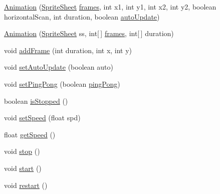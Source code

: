 \begin{DoxyCompactItemize}
\item 
\mbox{\hyperlink{classorg_1_1newdawn_1_1slick_1_1_animation_a417c8882467d579dcccd6befb0b7ae36}{Animation}} (\mbox{\hyperlink{classorg_1_1newdawn_1_1slick_1_1_sprite_sheet}{Sprite\+Sheet}} \mbox{\hyperlink{classorg_1_1newdawn_1_1slick_1_1_animation_a39f0c6a16e479985b22f7dd3bb781bf7}{frames}}, int x1, int y1, int x2, int y2, boolean horizontal\+Scan, int duration, boolean \mbox{\hyperlink{classorg_1_1newdawn_1_1slick_1_1_animation_a343dbff14a050cf8753e9a67746deede}{auto\+Update}})
\item 
\mbox{\hyperlink{classorg_1_1newdawn_1_1slick_1_1_animation_a1c523b4565c8f280afb975c754b817cf}{Animation}} (\mbox{\hyperlink{classorg_1_1newdawn_1_1slick_1_1_sprite_sheet}{Sprite\+Sheet}} ss, int\mbox{[}$\,$\mbox{]} \mbox{\hyperlink{classorg_1_1newdawn_1_1slick_1_1_animation_a39f0c6a16e479985b22f7dd3bb781bf7}{frames}}, int\mbox{[}$\,$\mbox{]} duration)
\item 
void \mbox{\hyperlink{classorg_1_1newdawn_1_1slick_1_1_animation_ae96843e67072ef3b085072cb0840a8ba}{add\+Frame}} (int duration, int x, int y)
\item 
void \mbox{\hyperlink{classorg_1_1newdawn_1_1slick_1_1_animation_ab7cbb6c10bf1678b0041d6d9a074a585}{set\+Auto\+Update}} (boolean auto)
\item 
void \mbox{\hyperlink{classorg_1_1newdawn_1_1slick_1_1_animation_aabdefa9397f19d852b66975d0680f312}{set\+Ping\+Pong}} (boolean \mbox{\hyperlink{classorg_1_1newdawn_1_1slick_1_1_animation_a6000f29f3e58e0470e2178e69345c027}{ping\+Pong}})
\item 
boolean \mbox{\hyperlink{classorg_1_1newdawn_1_1slick_1_1_animation_a1eed184d6fe5bef5731aaec8d95af56f}{is\+Stopped}} ()
\item 
void \mbox{\hyperlink{classorg_1_1newdawn_1_1slick_1_1_animation_a555e7cb21b9be341c41df7dd27323440}{set\+Speed}} (float spd)
\item 
float \mbox{\hyperlink{classorg_1_1newdawn_1_1slick_1_1_animation_ab73965713275ddde16a5c1b30e9d257b}{get\+Speed}} ()
\item 
void \mbox{\hyperlink{classorg_1_1newdawn_1_1slick_1_1_animation_abae71eebe022be03dc3bc696c2b1e6c1}{stop}} ()
\item 
void \mbox{\hyperlink{classorg_1_1newdawn_1_1slick_1_1_animation_a115069b3b06f876db39d90a61ab8d525}{start}} ()
\item 
void \mbox{\hyperlink{classorg_1_1newdawn_1_1slick_1_1_animation_a75484f44d2032efcf9f14dd303e35139}{restart}} ()
\item 

\end{DoxyCompactItemize}
